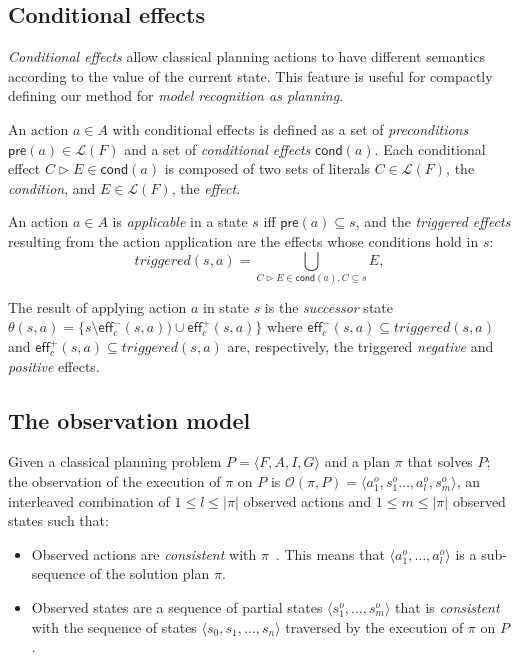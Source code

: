 \documentclass[letterpaper]{article} %
\newcommand{\tup}[1]{{\langle #1 \rangle}}
\newcommand{\pre}{\mathsf{pre}}     %
\newcommand{\eff}{\mathsf{eff}}     %
\newcommand{\cond}{\mathsf{cond}}   %
\begin{document}
\subsection{Conditional effects}
{\em Conditional effects} allow classical planning actions to have different semantics according to the value of the current state. This feature is useful for compactly defining our method for {\em model recognition as planning}. 

An action $a\in A$ with conditional effects is defined as a set of {\em preconditions} $\pre(a)\in\mathcal{L}(F)$ and a set of {\em conditional effects} $\cond(a)$. Each conditional effect $C\rhd E\in\cond(a)$ is composed of two sets of literals $C\in\mathcal{L}(F)$, the {\em condition}, and $E\in\mathcal{L}(F)$, the {\em effect}.

An action $a\in A$ is {\em applicable} in a state $s$ iff $\pre(a)\subseteq s$, and the {\em triggered effects} resulting from the action application are the effects whose conditions hold in $s$:
\[
triggered(s,a)=\bigcup_{C\rhd E\in\cond(a),C\subseteq s} E,
\]

The result of applying action $a$ in state $s$ is the {\em successor} state $\theta(s,a)=\{s\setminus\eff_c^-(s,a))\cup\eff_c^+(s,a)\}$ where $\eff_c^-(s,a)\subseteq triggered(s,a)$ and $\eff_c^+(s,a)\subseteq triggered(s,a)$ are, respectively, the triggered {\em negative} and {\em positive} effects.

\subsection{The observation model}
Given a classical planning problem $P=\tup{F,A,I,G}$ and a plan $\pi$ that solves $P$; the observation of the execution of $\pi$ on $P$ is $\mathcal{O}(\pi,P)=\tup{a_1^o,s_1^o \ldots , a_l^o, s_m^o}$, an interleaved combination of {\small $1\leq l\leq |\pi|$} observed actions and {\small $1\leq m\leq |\pi|$} observed states such that:
\begin{itemize}
\item Observed actions are {\em consistent} with $\pi$~\cite{ramirez2009plan}. This means that $\tup{a_1^o, \ldots, a_l^o}$ is a sub-sequence of the solution plan $\pi$.
\item Observed states are a sequence of partial states $\tup{s_1^o, \ldots, s_m^o}$ that is {\em consistent} with the sequence of states $\tup{s_0, s_1, \ldots, s_n}$ traversed by the execution of $\pi$ on $P$. 
\end{itemize}
\end{document}
